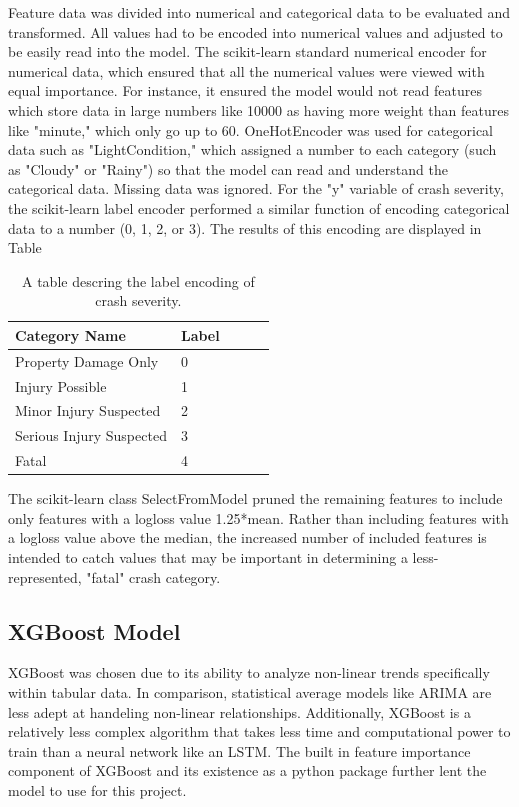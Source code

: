 \documentclass[12pt]{article}
\begin{document}
Feature data was divided into numerical and categorical data to be evaluated and transformed. All values had to be encoded into numerical values
and adjusted to be easily read into the model. 
 The scikit-learn standard numerical encoder for numerical data, which ensured that all the numerical values 
were viewed with equal importance. For instance, it ensured the model would not read features which store data in large numbers like 10000 as having more 
weight than features like "minute," which only go up to 60. OneHotEncoder was used for categorical data such as "LightCondition," which assigned
a number to each category (such as "Cloudy" or "Rainy") so that the model can read and understand the categorical data. Missing data was ignored.
For the "y" variable of crash severity, the scikit-learn label encoder performed a similar function of encoding categorical data to a number
(0, 1, 2, or 3). The results of this encoding are displayed in Table 

\begin{table}[]
\begin{center}
\begin{tabular}{lllll}
\hline
Category Name            & Label \\ \hline
Property Damage Only     & 0     \\
Injury Possible          & 1     \\
Minor Injury Suspected   & 2     \\
Serious Injury Suspected & 3     \\
Fatal                    & 4     \\
\end{tabular}
\caption{A table descring the label encoding of crash severity.}
  \label{fig:crashcategories}
\end{center}
\end{table}

The scikit-learn class SelectFromModel pruned the remaining features to include only features with a logloss value
1.25*mean. Rather than including features with a logloss value above the median, the increased number of included features is intended to catch
values that may be important in determining a less-represented, "fatal" crash category. 

\subsection{XGBoost Model}
 XGBoost was chosen due to its ability to analyze non-linear trends specifically within tabular data.
In comparison, statistical average models like ARIMA are less adept at handeling non-linear relationships.
Additionally, XGBoost is a relatively less complex algorithm that takes less time and computational power to train than a neural network
like an LSTM. The built in feature importance component of XGBoost and its existence as a python package further lent the
model to use for this project.
\end{document}
